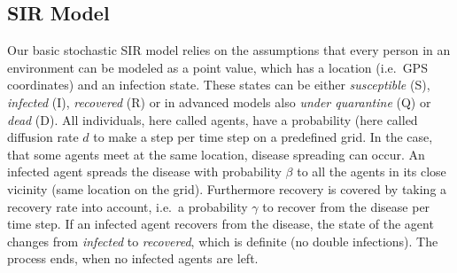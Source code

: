 \subsection{SIR Model}
Our basic stochastic SIR model relies on the assumptions that every person in an environment can be modeled as a point value, which has a location (i.e.\ GPS coordinates) and an infection state. These states can be either \textit{susceptible} (S), \textit{infected} (I), \textit{recovered} (R) or in advanced models also \textit{under quarantine} (Q) or \textit{dead} (D). All individuals, here called agents, have a probability (here called diffusion rate $d$ to make a step per time step on a predefined grid. In the case, that some agents meet at the same location, disease spreading can occur. An infected agent spreads the disease with probability $\beta$ to all the agents in its close vicinity (same location on the grid). Furthermore recovery is covered by taking a recovery rate into account, i.e.\ a probability $\gamma$ to recover from the disease per time step. If an infected agent recovers from the disease, the state of the agent changes from \textit{infected} to \textit{recovered}, which is definite (no double infections). The process ends, when no infected agents are left.

